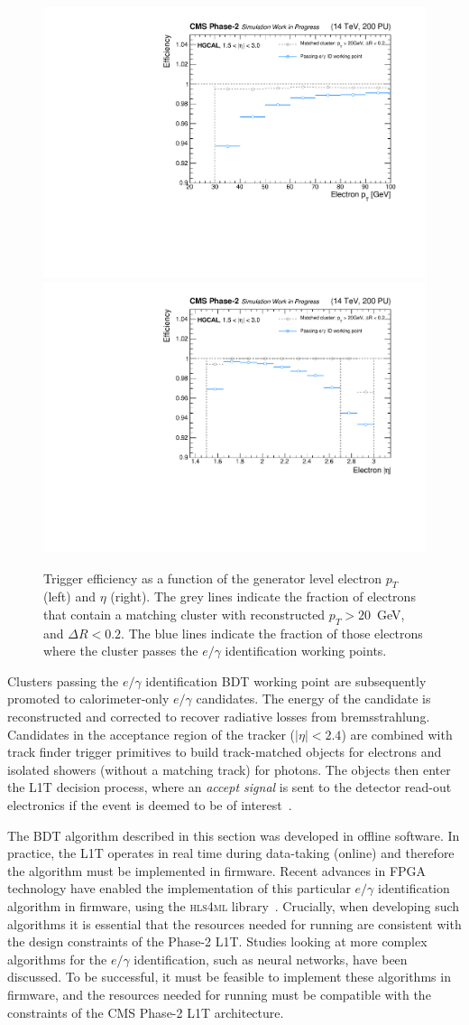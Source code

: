 \begin{figure}[htb!]
  \centering
  \includegraphics[width=.49\textwidth]{Figures/cms/egid/eff_vs_cl3d_gen_pt.pdf}
  \includegraphics[width=.49\textwidth]{Figures/cms/egid/eff_vs_cl3d_gen_eta.pdf}
  \caption[Efficiency of the $e/\gamma$ identification as a function of electron $p_T$ and $\eta$.]
  {
    Trigger efficiency as a function of the generator level electron $p_T$ (left) and $\eta$ (right). The grey lines indicate the fraction of electrons that contain a matching cluster with reconstructed $p_T>20$~GeV, and $\Delta R<0.2$. The blue lines indicate the fraction of those electrons where the cluster passes the $e/\gamma$ identification working points.
  }
  \label{fig:egid_efficiency}
\end{figure}

Clusters passing the $e/\gamma$ identification BDT working point are subsequently promoted to calorimeter-only $e/\gamma$ candidates. The energy of the candidate is reconstructed and corrected to recover radiative losses from bremsstrahlung. Candidates in the acceptance region of the tracker ($|\eta|<2.4$) are combined with track finder trigger primitives to build track-matched objects for electrons and isolated showers (without a matching track) for photons. The objects then enter the L1T decision process, where an \textit{accept signal} is sent to the detector read-out electronics if the event is deemed to be of interest~\cite{CERN-LHCC-2020-004}.

The BDT algorithm described in this section was developed in offline software. In practice, the L1T operates in real time during data-taking (online) and therefore the algorithm must be implemented in firmware. Recent advances in FPGA technology have enabled the implementation of this particular $e/\gamma$ identification algorithm in firmware, using the \textsc{hls4ml} library~\cite{Duarte_2018}. Crucially, when developing such algorithms it is essential that the resources needed for running are consistent with the design constraints of the Phase-2 L1T. Studies looking at more complex algorithms for the $e/\gamma$ identification, such as neural networks, have been discussed. To be successful, it must be feasible to implement these algorithms in firmware, and the resources needed for running must be compatible with the constraints of the CMS Phase-2 L1T architecture.

